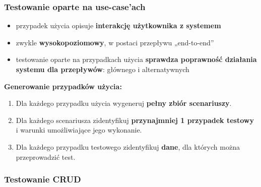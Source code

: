 \documentclass[../main.tex]{subfiles}
\begin{document}
    \subsubsection{Testowanie oparte na use-case'ach}
    \begin{itemize}
        \item przypadek użycia opisuje \textbf{interakcję użytkownika z systemem}
        \item zwykle \textbf{wysokopoziomowy}, w postaci przepływu „end-to-end”
        \item testowanie oparte na przypadkach użycia \textbf{sprawdza poprawność
        działania systemu dla przepływów}: głównego i alternatywnych
    \end{itemize}

    \textbf{Generowanie przypadków użycia:}
    \begin{enumerate}
        \item Dla każdego przypadku użycia wygeneruj \textbf{pełny zbiór scenariuszy}.
        \item Dla każdego scenariusza zidentyfikuj \textbf{przynajmniej 1 przypadek testowy} i warunki
        umożliwiające jego wykonanie.
        \item Dla każdego przypadku testowego zidentyfikuj \textbf{dane}, dla których można przeprowadzić test.
    \end{enumerate}


    \subsubsection{Testowanie CRUD}
\end{document}
